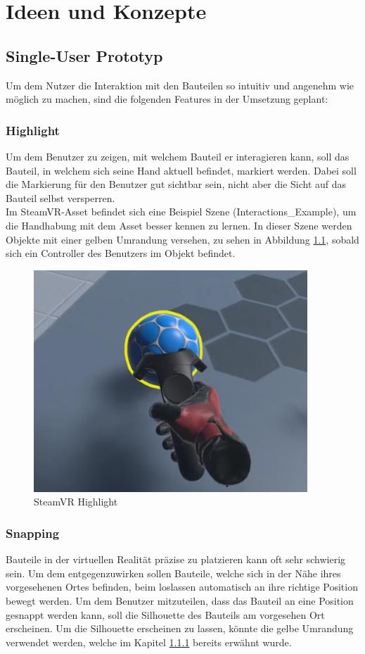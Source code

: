 \chapter{Ideen und Konzepte}
\label{ch:Ideen_und_Konzepte}

\section{Single-User Prototyp}
Um dem Nutzer die Interaktion mit den Bauteilen so intuitiv und angenehm wie möglich zu machen, sind die folgenden Features in der Umsetzung geplant:

\subsection{Highlight}
\label{ch:highlight}
Um dem Benutzer zu zeigen, mit welchem Bauteil er interagieren kann, soll das Bauteil, in welchem sich seine Hand aktuell befindet, markiert werden. Dabei soll die Markierung für den Benutzer gut sichtbar sein, nicht aber die Sicht auf das Bauteil selbst versperren. \\
Im SteamVR-Asset befindet sich eine Beispiel Szene (Interactions\_Example), um die Handhabung mit dem Asset besser kennen zu lernen. In dieser Szene werden Objekte mit einer gelben Umrandung versehen, zu sehen in Abbildung \ref{fig:steamvr_highlight}, sobald sich ein Controller des Benutzers im Objekt befindet.

\begin{figure}[h!]
	\centering
	\includegraphics[keepaspectratio,width=0.4\linewidth]{img/SteamVR_Highlight.PNG}
	\caption{SteamVR Highlight}
	\label{fig:steamvr_highlight}
\end{figure}
	
\subsection{Snapping}
Bauteile in der virtuellen Realität präzise zu platzieren kann oft sehr schwierig sein. Um dem entgegenzuwirken sollen Bauteile, welche sich in der Nähe ihres vorgesehenen Ortes befinden, beim loslassen automatisch an ihre richtige Position bewegt werden. Um dem Benutzer mitzuteilen, dass das Bauteil an eine Position \grqq gesnappt\grqq{} werden kann, soll die Silhouette des Bauteils am vorgesehen Ort erscheinen. Um die Silhouette erscheinen zu lassen, könnte die gelbe Umrandung verwendet werden, welche im Kapitel \ref{ch:highlight} bereits erwähnt wurde. 
	
